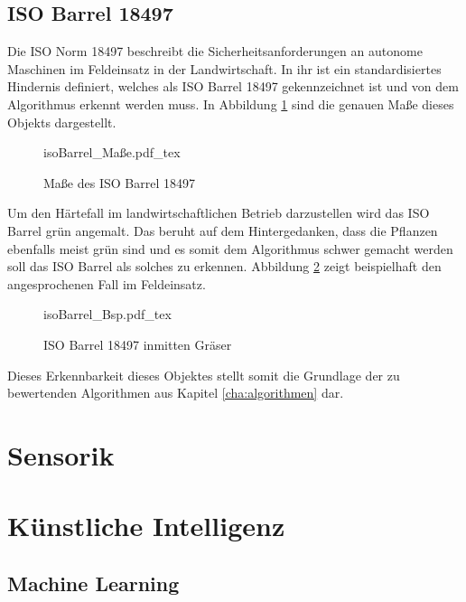 \documentclass[12pt,
titlepage,
a4paper,
oneside,     %
openany,     %
listof=totoc,  %
numbers = noenddot, %
bibliography=totoc,    %
headsepline, %
]{scrbook} %
\begin{document}
\subsection{ISO Barrel 18497}
\label{subsec_iso}

Die ISO Norm 18497 beschreibt die Sicherheitsanforderungen an autonome Maschinen im Feldeinsatz in der Landwirtschaft. In ihr ist ein standardisiertes Hindernis definiert, welches als ISO Barrel 18497 gekennzeichnet ist und von dem Algorithmus erkennt werden muss. In Abbildung \ref{fig:isoBarrel} sind die genauen Maße dieses Objekts dargestellt. \\

\begin{figure}[h]
	\centering
	\def\svgwidth{0.6\columnwidth}
	{isoBarrel_Maße.pdf_tex}
	\caption{Maße des ISO Barrel 18497}
	\label{fig:isoBarrel}
\end{figure}

Um den Härtefall im landwirtschaftlichen Betrieb darzustellen wird das ISO Barrel grün angemalt. Das beruht auf dem Hintergedanken, dass die Pflanzen ebenfalls meist grün sind und es somit dem Algorithmus schwer gemacht werden soll das ISO Barrel als solches zu erkennen. Abbildung \ref{fig:isoBarrelBsp} zeigt beispielhaft den angesprochenen Fall im Feldeinsatz. \\

\begin{figure}[h]
	\centering
	\def\svgwidth{0.8\columnwidth}
	{isoBarrel_Bsp.pdf_tex}
	\caption{ISO Barrel 18497 inmitten Gräser}
	\label{fig:isoBarrelBsp}
\end{figure}

Dieses Erkennbarkeit dieses Objektes stellt somit die Grundlage der zu bewertenden Algorithmen aus Kapitel \ref{cha:algorithmen} dar.

\section{Sensorik}
\label{sec_sensorik}

\section{Künstliche Intelligenz}
\label{sec_ki}

\subsection{Machine Learning}
\label{subsec_machine}
\end{document}
